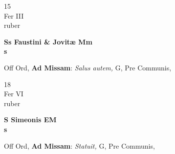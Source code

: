 \documentclass[10pt, openany]{book}
\begin{document}
        \begin{center}
            \begin{minipage}{3.5in}
                \vspace{2em}
                \begin{minipage}{0.5in}
                    {\Huge 15} \\
                    {\normalsize Fer III} \\
                    {\normalsize ruber}
                \end{minipage}
                \begin{minipage}{3.0in}
                    \textbf{ \large Ss Faustini \& Jovitæ Mm \\
                    \textnormal{\normalsize s}} \\ 
                \end{minipage}
                \begin{justify}Off Ord, \textbf{Ad Missam}: \textit{Salus autem,} G, Pre Communis,   
                \end{justify}
            \end{minipage}
        \end{center}
    
        \begin{center}
            \begin{minipage}{3.5in}
                \vspace{2em}
                \begin{minipage}{0.5in}
                    {\Huge 18} \\
                    {\normalsize Fer VI} \\
                    {\normalsize ruber}
                \end{minipage}
                \begin{minipage}{3.0in}
                    \textbf{ \large S Simeonis EM \\
                    \textnormal{\normalsize s}} \\ 
                \end{minipage}
                \begin{justify}Off Ord, \textbf{Ad Missam}: \textit{Statuit,} G, Pre Communis,   
                \end{justify}
            \end{minipage}
        \end{center}
    
\end{document}
